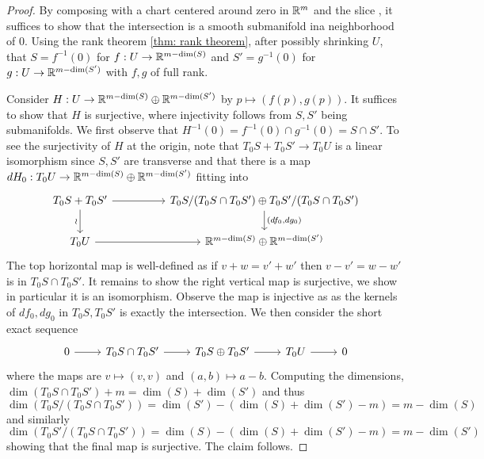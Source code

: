 \begin{proof}
    By composing with a chart centered around zero in $\mathbb{R}^{m}$ and the slice , it suffices to show that the intersection is a smooth submanifold ina  neighborhood of 0. Using the rank theorem \ref{thm: rank theorem}, after possibly shrinking $U$, that $S=f^{-1}(0)$ for $f:U\to\mathbb{R}^{m-\dim(S)}$ and $S'=g^{-1}(0)$ for $g:U\to\mathbb{R}^{m-\dim(S')}$ with $f,g$ of full rank. 

    Consider $H:U\to\mathbb{R}^{m-\dim(S)}\oplus\mathbb{R}^{m-\dim(S')}$ by $p\mapsto(f(p),g(p))$. It suffices to show that $H$ is surjective, where injectivity follows from $S,S'$ being submanifolds. We first observe that $H^{-1}(0)=f^{-1}(0)\cap g^{-1}(0)=S\cap S'$. To see the surjectivity of $H$ at the origin, note that $T_{0}S+ T_{0}S'\to T_{0}U$ is a linear isomorphism since $S,S'$ are transverse and that there is a map $dH_{0}:T_{0}U\to\mathbb{R}^{m-\dim(S)}\oplus\mathbb{R}^{m-\dim(S')}$ fitting into 
    $$%
    \begin{tikzcd}
        {T_{0}S+ T_{0}S'} && {T_{0}S/(T_{0}S\cap T_{0}S')\oplus T_{0}S'/(T_{0}S\cap T_{0}S')} \\
        {T_{0}U} && {\RR^{m-\dim(S)}\oplus\RR^{m-\dim(S')}}
        \arrow[from=1-1, to=1-3]
        \arrow["\wr"', from=1-1, to=2-1]
        \arrow["{(df_{0},dg_{0})}", from=1-3, to=2-3]
        \arrow[from=2-1, to=2-3]
    \end{tikzcd}$$
    The top horizontal map is well-defined as if $v+w=v'+w'$ then $v-v'=w-w'$ is in $T_{0}S\cap T_{0}S'$. It remains to show the right vertical map is surjective, we show in particular it is an isomorphism. Observe the map is injective as as the kernels of $df_{0},dg_{0}$ in $T_{0}S,T_{0}S'$ is exactly the intersection. We then consider the short exact sequence 
    $$%
    \begin{tikzcd}
        0 & {T_{0}S\cap T_{0}S'} & {T_{0}S\oplus T_{0}S'} & {T_{0}U} & 0
        \arrow[from=1-1, to=1-2]
        \arrow[from=1-2, to=1-3]
        \arrow[from=1-3, to=1-4]
        \arrow[from=1-4, to=1-5]
    \end{tikzcd}$$
    where the maps are $v\mapsto (v,v)$ and $(a,b)\mapsto a-b$. Computing the dimensions, $\dim(T_{0}S\cap T_{0}S')+m=\dim(S)+\dim(S')$ and thus $\dim(T_{0}S/(T_{0}S\cap T_{0}S'))=\dim(S')-(\dim(S)+\dim(S')-m)=m-\dim(S)$ and similarly $\dim(T_{0}S'/(T_{0}S\cap T_{0}S'))=\dim(S)-(\dim(S)+\dim(S')-m)=m-\dim(S')$ showing that the final map is surjective. The claim follows. 
\end{proof}
